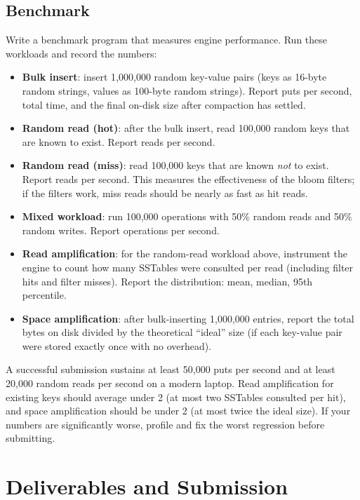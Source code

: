 \documentclass[11pt,a4paper]{article}
\begin{document}
\subsection{Benchmark}
Write a benchmark program that measures engine performance. Run these workloads and record the numbers:

\begin{itemize}
\item \textbf{Bulk insert}: insert 1{,}000{,}000 random key-value pairs (keys as 16-byte random strings, values as 100-byte random strings). Report puts per second, total time, and the final on-disk size after compaction has settled.

\item \textbf{Random read (hot)}: after the bulk insert, read 100{,}000 random keys that are known to exist. Report reads per second.

\item \textbf{Random read (miss)}: read 100{,}000 keys that are known \textit{not} to exist. Report reads per second. This measures the effectiveness of the bloom filters; if the filters work, miss reads should be nearly as fast as hit reads.

\item \textbf{Mixed workload}: run 100{,}000 operations with 50\% random reads and 50\% random writes. Report operations per second.

\item \textbf{Read amplification}: for the random-read workload above, instrument the engine to count how many SSTables were consulted per read (including filter hits and filter misses). Report the distribution: mean, median, 95th percentile.

\item \textbf{Space amplification}: after bulk-inserting 1{,}000{,}000 entries, report the total bytes on disk divided by the theoretical ``ideal'' size (if each key-value pair were stored exactly once with no overhead).
\end{itemize}

A successful submission sustains at least 50{,}000 puts per second and at least 20{,}000 random reads per second on a modern laptop. Read amplification for existing keys should average under 2 (at most two SSTables consulted per hit), and space amplification should be under 2 (at most twice the ideal size). If your numbers are significantly worse, profile and fix the worst regression before submitting.

\section{Deliverables and Submission}
\end{document}
